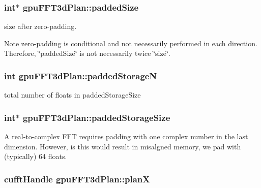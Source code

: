 \hypertarget{structgpuFFT3dPlan_a1699c93376061d98a1095da736918faa}{
\subsubsection[{paddedSize}]{\setlength{\rightskip}{0pt plus 5cm}int$\ast$ {\bf gpuFFT3dPlan::paddedSize}}}
\label{structgpuFFT3dPlan_a1699c93376061d98a1095da736918faa}


size after zero-\/padding. 

\begin{DoxyNote}{Note}
zero-\/padding is conditional and not necessarily performed in each direction. Therefore, \char`\"{}paddedSize\char`\"{} is not necessarily twice \char`\"{}size\char`\"{}. 
\end{DoxyNote}
\hypertarget{structgpuFFT3dPlan_a3e5e57c4d604400177e9d88954375640}{
\subsubsection[{paddedStorageN}]{\setlength{\rightskip}{0pt plus 5cm}int {\bf gpuFFT3dPlan::paddedStorageN}}}
\label{structgpuFFT3dPlan_a3e5e57c4d604400177e9d88954375640}


total number of floats in paddedStorageSize 

\hypertarget{structgpuFFT3dPlan_aa894aac0e4982dc5f73d4041625b4708}{
\subsubsection[{paddedStorageSize}]{\setlength{\rightskip}{0pt plus 5cm}int$\ast$ {\bf gpuFFT3dPlan::paddedStorageSize}}}
\label{structgpuFFT3dPlan_aa894aac0e4982dc5f73d4041625b4708}


A real-\/to-\/complex FFT requires padding with one complex number in the last dimension. However, is this would result in misalgned memory, we pad with (typically) 64 floats. 

\hypertarget{structgpuFFT3dPlan_a89812c2651a2240407ea83404c489265}{
\subsubsection[{planX}]{\setlength{\rightskip}{0pt plus 5cm}cufftHandle {\bf gpuFFT3dPlan::planX}}}
\label{structgpuFFT3dPlan_a89812c2651a2240407ea83404c489265}


